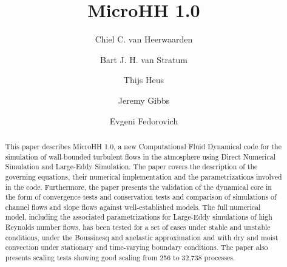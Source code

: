 \documentclass[gmd]{copernicus}
\begin{document}
\linenumbers

\title{MicroHH 1.0}


\author[1]{Chiel C. van Heerwaarden}
\author[1]{Bart J. H. van Stratum}
\author[2]{Thijs Heus}
\author[3]{Jeremy Gibbs}
\author[3]{Evgeni Fedorovich}










\received{}
\pubdiscuss{} %
\revised{}
\accepted{}
\published{}




\maketitle  %

\begin{abstract}
This paper describes MicroHH 1.0, a new Computational Fluid Dynamical code for the simulation of wall-bounded turbulent flows in the atmosphere using Direct Numerical Simulation and Large-Eddy Simulation. The paper covers the description of the governing equations, their numerical implementation and the parametrizations involved in the code. Furthermore, the paper presents the validation of the dynamical core in the form of convergence tests and conservation tests and comparison of simulations of channel flows and slope flows against well-established models. The full numerical model, including the associated parametrizations for Large-Eddy simulations of high Reynolds number flows, has been tested for a set of cases under stable and unstable conditions, under the Boussinesq and anelastic approximation and with dry and moist convection under stationary and time-varying boundary conditions. The paper also presents scaling tests showing good scaling from 256 to 32,738 processes.
\end{abstract}
\end{document}
